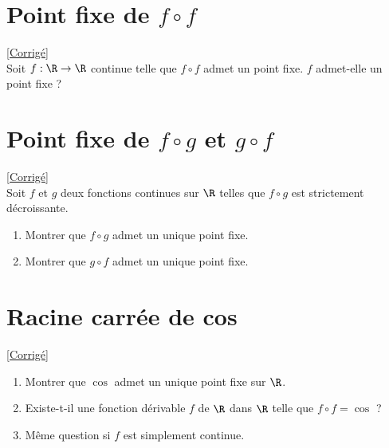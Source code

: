 \documentclass{book}
\begin{document}
	\section{Point fixe de $f\circ f$ }
	\textcolor{blue}{\hyperref[Point fixe de fof corrigé]{[Corrigé]}}\\
	\label{Point fixe de fof}
	Soit $f:\R\to\R$ continue telle que $f \circ f$ admet un point fixe. $f$ admet-elle un point fixe ?
	
	\section{Point fixe de $f\circ g$ et $g\circ f$ }
	\textcolor{blue}{\hyperref[Point fixe de fog et gof corrigé]{[Corrigé]}}\\
	\label{Point fixe de fog et gof}
	Soit $f$ et $g$ deux fonctions continues sur $\R$ telles que $f\circ g$ est strictement décroissante.
	\begin{enumerate}
		\item Montrer que $f\circ g$ admet un unique point fixe.
		\item Montrer que $g\circ f$ admet un unique point fixe.
	\end{enumerate}
	
	\section{Racine carrée de cos }
	\textcolor{blue}{\hyperref[Racine carrée de cos corrigé]{[Corrigé]}}\\
	\label{Racine carrée de cos}
	\begin{enumerate}[leftmargin=*]
		\item Montrer que $\cos$ admet un unique point fixe sur $\R$.
		\item Existe-t-il une fonction dérivable $f$ de $\R$ dans $\R$ telle que $f\circ f=\cos$ ?
		\item Même question si $f$ est simplement continue.
	\end{enumerate}
	
\end{document}
